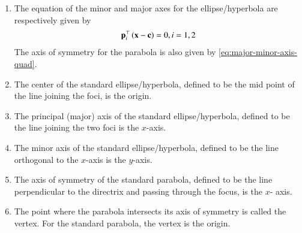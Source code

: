 \begin{enumerate}[label=\thesubsection.\arabic*.,ref=\thesubsection.\theenumi]
\begin{enumerate}
		\end{enumerate}
    
%
    \item The equation of the minor and major  axes for the ellipse/hyperbola are respectively given by 
  \begin{align}
\mathbf{p}_i^{\top}\left(\mathbf{x}-\mathbf{c}\right) = 0, i = 1,2
	  \label{eq:major-minor-axis-quad}
  \end{align}
  The axis of symmetry for the parabola is also given by 
	  \eqref{eq:major-minor-axis-quad}.

	\item
			The center of the standard ellipse/hyperbola, defined to be the mid point of the line joining the foci, is the origin.
	
	\item
			The principal (major) axis of the standard ellipse/hyperbola, defined to be the line joining the two foci   is the $x$-axis.  
	
	\item
			The minor axis of the standard ellipse/hyperbola, defined to be the line orthogonal to the $x$-axis is the $y$-axis. 
	


	\item
			The axis of symmetry of the standard parabola, defined to be the line perpendicular to the directrix and passing through the focus,  is the $x$- axis.
	


	\item
 The point where the parabola intersects its axis of symmetry is called the vertex. For the standard parabola, the vertex is the origin.
	

\end{enumerate}
